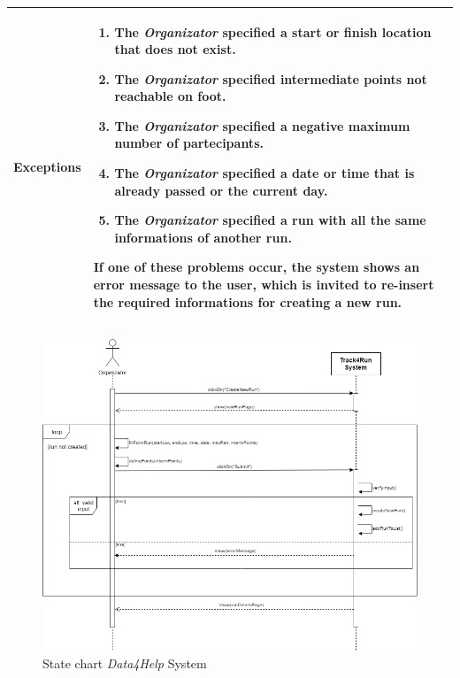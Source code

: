 \begin{table}[H]
\begin{tabular}{|p{3.5cm}|p{10.3cm}|}
    \hline
    \textbf{\large{Exceptions}} 		& \begin{enumerate}[leftmargin=0.5cm]
                                          	\item The \emph{Organizator} specified a start or finish location that does not exist.
                                            \item The \emph{Organizator} specified intermediate points not reachable on foot.
                                             \item The \emph{Organizator} specified a negative maximum number of partecipants.
                                            \item The \emph{Organizator} specified a date or time that is already passed or the current day.
                                            \item The \emph{Organizator} specified a run with all the same informations of another run.
                                          \end{enumerate}
    										If one of these problems occur, the system shows an error message to the user, which is invited to re-insert the required informations for creating a new run.\\
    
    \hline
    
    
    \end{tabular}
	
\end{table}

\begin{figure}[H]
    \centering
    \includegraphics[scale=0.4]{Pictures/createNewRunSeqDiag.png}
    \caption{State chart  \emph{Data4Help} System}
\end{figure}
